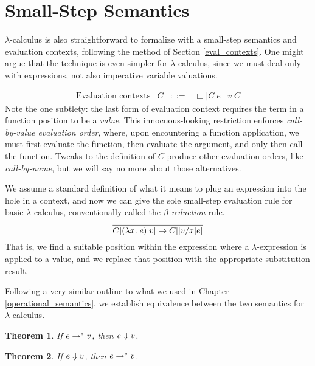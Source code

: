 \documentclass{amsbook}
\newtheorem{theorem}{Theorem}[chapter]
\theoremstyle{definition}
\theoremstyle{remark}
\numberwithin{section}{chapter}
\numberwithin{equation}{chapter}
\begin{document}
\section{Small-Step Semantics}

$\lambda$-calculus is also straightforward to formalize with a small-step semantics and evaluation contexts, following the method of Section \ref{eval_contexts}.
One might argue that the technique is even simpler for $\lambda$-calculus, since we must deal only with expressions, not also imperative variable valuations.

$$\begin{array}{rrcl}
  \textrm{Evaluation contexts} & C &::=& \Box \mid C \; e \mid v \; C
\end{array}$$
Note the one subtlety: the last form of evaluation context requires the term in a function position to be a \emph{value}.
This innocuous-looking restriction enforces \emph{call-by-value evaluation order}, where, upon encountering a function application, we must first evaluate the function, then evaluate the argument, and only then call the function.
Tweaks to the definition of $C$ produce other evaluation orders, like \emph{call-by-name}, but we will say no more about those alternatives.

We assume a standard definition of what it means to plug an expression into the hole in a context, and now we can give the sole small-step evaluation rule for basic $\lambda$-calculus, conventionally called the \emph{$\beta$-reduction} rule.
\encoding
$$\infer{\smallstep{\plug{C}{(\lambda x. \; e) \; v}}{\plug{C}{\subst{e}{x}{v}}}}{}$$
That is, we find a suitable position within the expression where a $\lambda$-expression is applied to a value, and we replace that position with the appropriate substitution result.

Following a very similar outline to what we used in Chapter \ref{operational_semantics}, we establish equivalence between the two semantics for $\lambda$-calculus.

\begin{theorem}
  If $e \to^* v$, then $e \Downarrow v$.
\end{theorem}

\begin{theorem}
  If $e \Downarrow v$, then $e \to^* v$.
\end{theorem}
\end{document}
